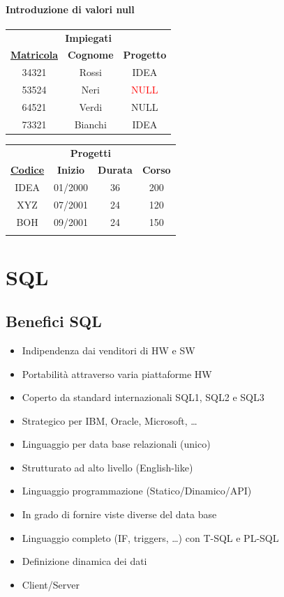 \documentclass[12pt,a4paper]{article}
\begin{document}
\paragraph{Introduzione di valori null}
\begin{center}
\begin{tabular}{ccc}
\multicolumn{3}{c}{\textbf{Impiegati}} \\
\underline{\textbf{Matricola}} & \textbf{Cognome} & \textbf{Progetto} \\ \hline
34321 & Rossi & IDEA \\
53524 & Neri & \textcolor{red}{NULL} \\
64521 & Verdi & NULL \\ 
73321 & Bianchi & IDEA\\ \hline
\end{tabular} \Sep \Sep
\begin{tabular}{cccc}
\multicolumn{4}{c}{\textbf{Progetti}} \\
\underline{\textbf{Codice}} & \textbf{Inizio} & \textbf{Durata} & \textbf{Corso} \\ \hline
IDEA & 01/2000 & 36 & 200 \\
XYZ & 07/2001 & 24 & 120 \\
BOH & 09/2001 & 24 & 150 \\
 &  &  & \\ \hline
\end{tabular}
\end{center}


\clearpage
\section{SQL}
\subsection{Benefici SQL}
\begin{itemize}
\item Indipendenza dai venditori di HW e SW
\item Portabilità attraverso varia piattaforme HW
\item Coperto da standard internazionali SQL1, SQL2 e SQL3
\item Strategico per IBM, Oracle, Microsoft, …
\item Linguaggio per data base relazionali (unico)
\item Strutturato ad alto livello (English-like)
\item Linguaggio programmazione (Statico/Dinamico/API)
\item In grado di fornire viste diverse del data base
\item Linguaggio completo (IF, triggers, …) con T-SQL e PL-SQL
\item Definizione dinamica dei dati
\item Client/Server
\end{itemize}
\end{document}
